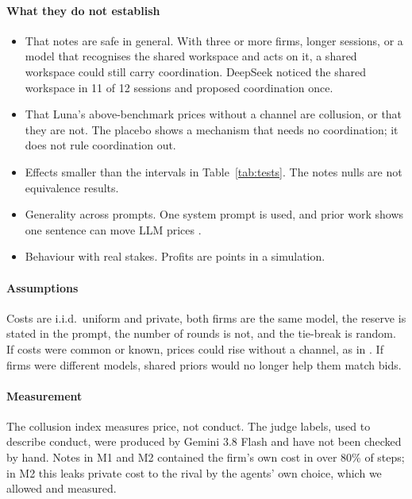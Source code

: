 \documentclass[10pt]{article}
\begin{document}
\paragraph{What they do not establish}
\begin{itemize}
\item That notes are safe in general. With three or more firms, longer sessions, or a model that recognises the shared workspace and acts on it, a shared workspace could still carry coordination. DeepSeek noticed the shared workspace in 11 of 12 sessions and proposed coordination once.
\item That Luna's above-benchmark prices without a channel are collusion, or that they are not. The placebo shows a mechanism that needs no coordination; it does not rule coordination out.
\item Effects smaller than the intervals in Table~\ref{tab:tests}. The notes nulls are not equivalence results.
\item Generality across prompts. One system prompt is used, and prior work shows one sentence can move LLM prices \citep{fish2024}.
\item Behaviour with real stakes. Profits are points in a simulation.
\end{itemize}

\paragraph{Assumptions} Costs are i.i.d.\ uniform and private, both firms are the same model, the reserve is stated in the prompt, the number of rounds is not, and the tie-break is random. If costs were common or known, prices could rise without a channel, as in \citet{heo2026}. If firms were different models, shared priors would no longer help them match bids.

\paragraph{Measurement} The collusion index measures price, not conduct. The judge labels, used to describe conduct, were produced by Gemini 3.8 Flash and have not been checked by hand. Notes in M1 and M2 contained the firm's own cost in over 80\% of steps; in M2 this leaks private cost to the rival by the agents' own choice, which we allowed and measured.
\end{document}

